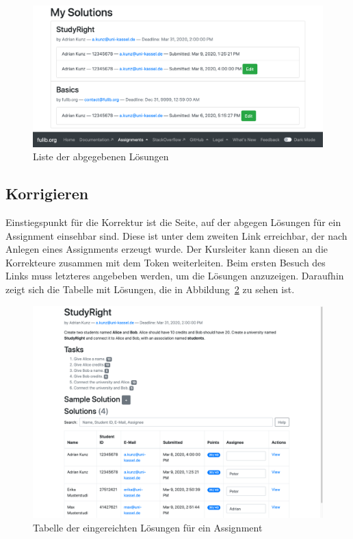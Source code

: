 \begin{figure}
    \centering
    \includegraphics[width=\textwidth]{chapter/fulib.org/img/my-solutions.png}
    \caption{Liste der abgegebenen Lösungen}
    \label{fig:my-solutions}
\end{figure}

\subsection{Korrigieren}\label{subsec:correcting}

Einstiegspunkt für die Korrektur ist die Seite, auf der abgegen Lösungen für ein Assignment einsehbar sind.
Diese ist unter dem zweiten Link erreichbar, der nach Anlegen eines Assignments erzeugt wurde.
Der Kursleiter kann diesen an die Korrekteure zusammen mit dem Token weiterleiten.
Beim ersten Besuch des Links muss letzteres angebeben werden, um die Lösungen anzuzeigen.
Daraufhin zeigt sich die Tabelle mit Lösungen, die in Abbildung~\ref{fig:solution-table} zu sehen ist.

\begin{figure}
    \centering
    \includegraphics[width=\textwidth]{chapter/fulib.org/img/solution-table.png}
    \caption{Tabelle der eingereichten Lösungen für ein Assignment}
    \label{fig:solution-table}
\end{figure}

